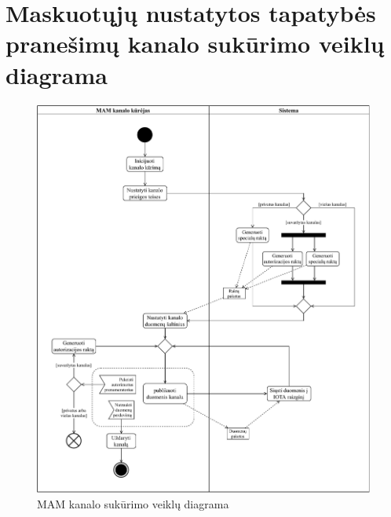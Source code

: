 \section{Maskuotųjų nustatytos tapatybės pranešimų kanalo sukūrimo veiklų diagrama} \label{appendix:4}
\begin{figure}[H]
    \centering
    \includegraphics[scale=0.7]{images/ad-1}
    \caption{MAM kanalo sukūrimo veiklų diagrama}
\end{figure}

